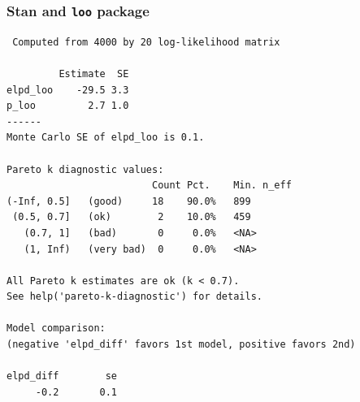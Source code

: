 \documentclass[10pt]{beamer}
\begin{document}
\begin{frame}[fragile]

\frametitle{Stan and {\tt loo} package}

  {\scriptsize
\begin{lstlisting}
 Computed from 4000 by 20 log-likelihood matrix

         Estimate  SE
elpd_loo    -29.5 3.3
p_loo         2.7 1.0
------
Monte Carlo SE of elpd_loo is 0.1.

Pareto k diagnostic values:
                         Count Pct.    Min. n_eff
(-Inf, 0.5]   (good)     18    90.0%   899
 (0.5, 0.7]   (ok)        2    10.0%   459
   (0.7, 1]   (bad)       0     0.0%   <NA>
   (1, Inf)   (very bad)  0     0.0%   <NA>

All Pareto k estimates are ok (k < 0.7).
See help('pareto-k-diagnostic') for details.

Model comparison:
(negative 'elpd_diff' favors 1st model, positive favors 2nd)

elpd_diff        se
     -0.2       0.1
\end{lstlisting}
}

\end{frame}
\end{document}
